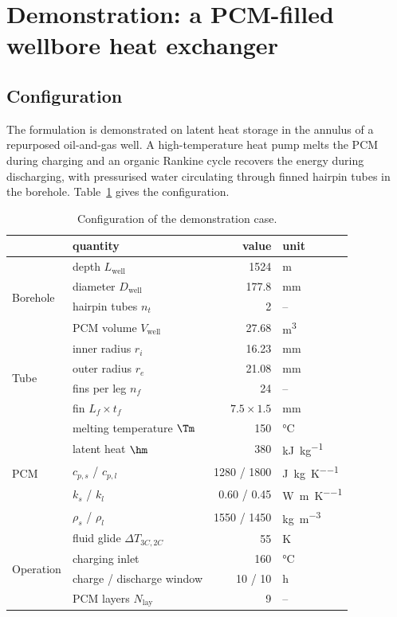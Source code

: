 \section{Demonstration: a PCM-filled wellbore heat exchanger}
\label{sec:demo}

\subsection{Configuration}

The formulation is demonstrated on latent heat storage in the annulus of a
repurposed oil-and-gas well. A high-temperature heat pump melts the PCM during
charging and an organic Rankine cycle recovers the energy during discharging,
with pressurised water circulating through finned hairpin tubes in the borehole.
Table~\ref{tab:config} gives the configuration.

\begin{table}[htbp]
\centering
\caption{Configuration of the demonstration case.}
\label{tab:config}
\begin{tabular}{@{}l l r l@{}}
\toprule
 & quantity & value & unit \\
\midrule
\multirow{4}{*}{Borehole}
 & depth $L_{\mathrm{well}}$ & 1524 & \si{\meter} \\
 & diameter $D_{\mathrm{well}}$ & 177.8 & \si{\milli\meter} \\
 & hairpin tubes $n_{t}$ & 2 & -- \\
 & PCM volume $V_{\mathrm{well}}$ & 27.68 & \si{\meter\cubed} \\
\midrule
\multirow{4}{*}{Tube}
 & inner radius $r_{i}$ & 16.23 & \si{\milli\meter} \\
 & outer radius $r_{e}$ & 21.08 & \si{\milli\meter} \\
 & fins per leg $n_{f}$ & 24 & -- \\
 & fin $L_{f}\times t_{f}$ & $7.5\times1.5$ & \si{\milli\meter} \\
\midrule
\multirow{5}{*}{PCM}
 & melting temperature $\Tm$ & 150 & \si{\celsius} \\
 & latent heat $\hm$ & 380 & \si{\kilo\joule\per\kilogram} \\
 & $c_{p,s}$ / $c_{p,l}$ & 1280 / 1800 & \si{\joule\per\kilogram\per\kelvin} \\
 & $k_{s}$ / $k_{l}$ & 0.60 / 0.45 & \si{\watt\per\meter\per\kelvin} \\
 & $\rho_{s}$ / $\rho_{l}$ & 1550 / 1450 & \si{\kilogram\per\meter\cubed} \\
\midrule
\multirow{4}{*}{Operation}
 & fluid glide $\Delta T_{3C,2C}$ & 55 & \si{\kelvin} \\
 & charging inlet & 160 & \si{\celsius} \\
 & charge / discharge window & 10 / 10 & \si{\hour} \\
 & PCM layers $N_{\mathrm{lay}}$ & 9 & -- \\
\bottomrule
\end{tabular}
\end{table}

